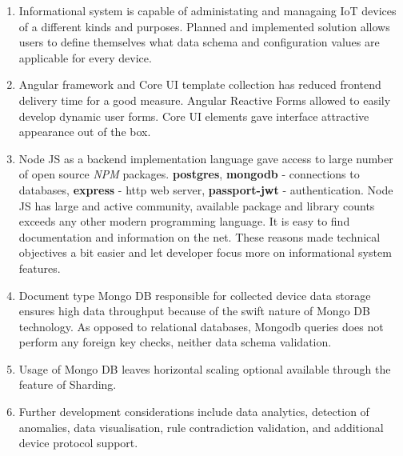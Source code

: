 \documentclass{VUMIFInfBakalaurinis}
\begin{document}
\begin{enumerate}
\item Informational system is capable of administating and managaing IoT devices of a different kinds and purposes.
Planned and implemented solution allows users to define themselves what data schema and configuration values are applicable for every device.

\item Angular framework and Core UI template collection has reduced frontend delivery time for a good measure.
Angular Reactive Forms allowed to easily develop dynamic user forms.
Core UI elements gave interface attractive appearance out of the box.

\item Node JS as a backend implementation language gave access to large number of open source \emph{NPM} packages. 
\textbf{postgres}, \textbf{mongodb} - connections to databases, \textbf{express} - http web server, \textbf{passport-jwt} - authentication.
Node JS has large and active community, available package and library counts exceeds any other modern programming language.
It is easy to find documentation and information on the net.
These reasons made technical objectives a bit easier and let developer focus more on informational system features.

\item Document type Mongo DB responsible for collected device data storage ensures high data throughput because of the swift nature of Mongo DB technology.
As opposed to relational databases, Mongodb queries does not perform any foreign key checks, neither data schema validation.

\item Usage of Mongo DB leaves horizontal scaling optional available through the feature of Sharding.

\item Further development considerations include data analytics, detection of anomalies, data visualisation, rule contradiction validation,
and additional device protocol support.
\end{enumerate}

\printbibliography[heading=bibintoc] %
\end{document}
